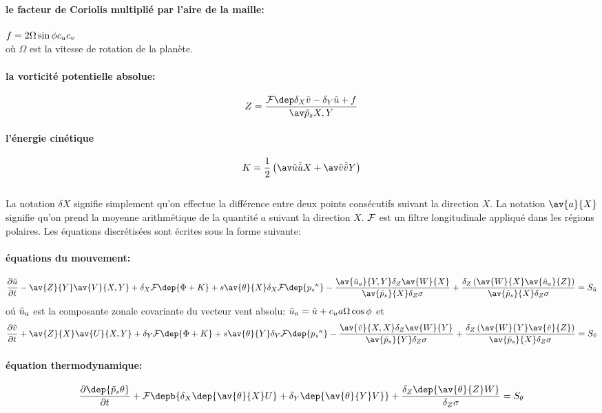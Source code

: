\paragraph{le facteur de Coriolis multipli\'e par l'aire de la maille:}
$f=2\Omega \sin{\phi} c_u c_v$\\
o\`u $\Omega$ est la vitesse de rotation de la plan\`ete.
%
\paragraph{la vorticit\'e potentielle absolue:}
\begin{equation}
Z=\Z
\end{equation}
%
\paragraph{l'\'energie cin\'etique}
\begin{equation}
K=\K
\end{equation}\\
%
La notation $\delta X$ signifie simplement qu'on
effectue la diff\'erence entre deux points cons\'ecutifs
suivant la direction $X$.
La notation $\av{a}{X}$ signifie qu'on prend la moyenne arithm\'etique
de la quantit\'e $a$ suivant la direction $X$. ${\cal F}$ est un filtre longitudinale appliqu\'e dans les r\'egions polaires.
Les \'equations discr\'etis\'ees sont \'ecrites sous la forme
suivante:
\paragraph{\'equations du mouvement:}
\begin{equation} \label{eq:u1}
\dt{\ucov} -
\av{Z}{Y} \av{V}{X,Y} 
+ \dx \filtre\dep{\Phi + K}
+s \av{\h}{X} \dx \filtre\dep{\psk}
- \frac{\av{\uabs}{Y,Y} \dz \av{W}{X} }
{\av{\pext}{X} \dsig }
+ \frac{\dz \left( \av{W}{X} \av{\uabs}{Z} \right) }
{\av{\pext}{X} \dsig}
=S_{\ucov}
\end{equation}
o\'u $\tilde{u}_{a}$ est la composante zonale covariante
du vecteur vent absolu:
$\tilde{u}_{a}=\tilde{u}+c_u a \Omega \cos{\phi}$ et
\begin{equation} \label{eq:v1}
\dt{\vcov} + \av{Z}{X} \av{U}{X,Y} + \dy \filtre\dep{\Phi + K}
+s \av{\h}{Y} \dy \filtre\dep{\psk}
- \frac{\av{\vcov}{X,X} \dz \av{W}{Y} }
{\av{\pext}{Y} \dsig}
+ \frac{\dz \left( \av{W}{Y} \av{\vcov}{Z} \right) }
{\av{\pext}{X} \dsig}
=S_{\vcov}
\end{equation}
%
\paragraph{\'equation thermodynamique:}
%
\begin{equation}
\label{eq:thermo}
\dt{\dep{\pext \h}}
+\filtre\depb{\dx \dep{\av{\h}{X}U} +\dy \dep{\av{\h}{Y}V} }
+\frac{\dz \dep{\av{\h}{Z} W}}{\dz \sigma}=S_\h
\end{equation}
%
